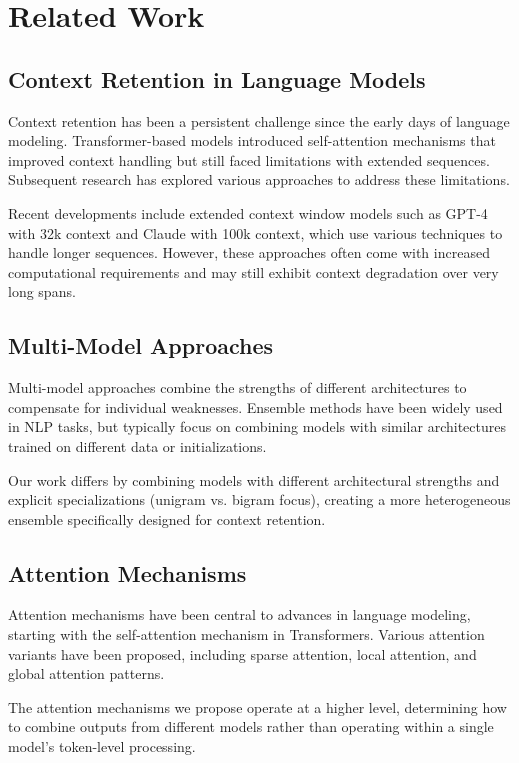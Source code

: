 \documentclass[conference]{IEEEtran}
\begin{document}
\section{Related Work}

\subsection{Context Retention in Language Models}
Context retention has been a persistent challenge since the early days of language modeling. Transformer-based models introduced self-attention mechanisms that improved context handling but still faced limitations with extended sequences. Subsequent research has explored various approaches to address these limitations.

Recent developments include extended context window models such as GPT-4 with 32k context and Claude with 100k context, which use various techniques to handle longer sequences. However, these approaches often come with increased computational requirements and may still exhibit context degradation over very long spans.

\subsection{Multi-Model Approaches}
Multi-model approaches combine the strengths of different architectures to compensate for individual weaknesses. Ensemble methods have been widely used in NLP tasks, but typically focus on combining models with similar architectures trained on different data or initializations.

Our work differs by combining models with different architectural strengths and explicit specializations (unigram vs. bigram focus), creating a more heterogeneous ensemble specifically designed for context retention.

\subsection{Attention Mechanisms}
Attention mechanisms have been central to advances in language modeling, starting with the self-attention mechanism in Transformers. Various attention variants have been proposed, including sparse attention, local attention, and global attention patterns.

The attention mechanisms we propose operate at a higher level, determining how to combine outputs from different models rather than operating within a single model's token-level processing.
\end{document}
